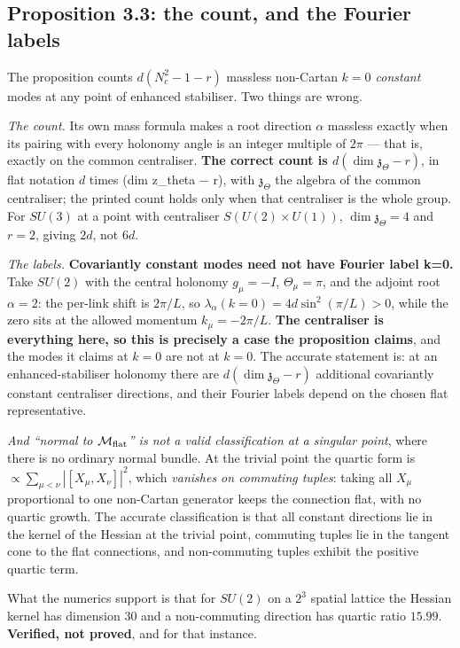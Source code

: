 \documentclass[11pt]{article}
\newcommand{\Mf}{\mathcal M_{\rm flat}}
\newcommand{\z}{\mathfrak z}
\begin{document}
\subsection{Proposition 3.3: the count, and the Fourier labels}

The proposition counts $d(N_c^2-1-r)$ massless non-Cartan \emph{$k=0$ constant} modes at
any point of enhanced stabiliser. Two things are wrong.

\emph{The count.} Its own mass formula makes a root direction $\alpha$ massless exactly
when its pairing with every holonomy angle is an integer multiple of $2\pi$ --- that is,
exactly on the common centraliser. \textbf{The correct count is $d(\dim\z_\Theta-r)$},
in flat notation $d$ times (dim z\_theta $-$ r), with $\z_\Theta$ the algebra of the
common centraliser; the printed count holds only when that centraliser is the whole
group. For $SU(3)$ at a point with centraliser $S(U(2)\times U(1))$, $\dim\z_\Theta=4$
and $r=2$, giving $2d$, not $6d$.

\emph{The labels.} \textbf{Covariantly constant modes need not have Fourier label k=0.}
Take $SU(2)$ with the central holonomy $g_\mu=-I$, $\Theta_\mu=\pi$, and the adjoint root
$\alpha=2$: the per-link shift is $2\pi/L$, so
$\lambda_\alpha(k=0)=4d\sin^2(\pi/L)>0$, while the zero sits at the allowed momentum
$k_\mu=-2\pi/L$. \textbf{The centraliser is everything here, so this is precisely a case
the proposition claims}, and the modes it claims at $k=0$ are not at $k=0$. The accurate
statement is: at an enhanced-stabiliser holonomy there are $d(\dim\z_\Theta-r)$
additional covariantly constant centraliser directions, and their Fourier labels depend
on the chosen flat representative.

\emph{And ``normal to $\Mf$'' is not a valid classification at a singular point}, where
there is no ordinary normal bundle. At the trivial point the quartic form is
$\propto\sum_{\mu<\nu}|[X_\mu,X_\nu]|^2$, which \emph{vanishes on commuting tuples}:
taking all $X_\mu$ proportional to one non-Cartan generator keeps the connection flat,
with no quartic growth. The accurate classification is that all constant directions lie
in the kernel of the Hessian at the trivial point, commuting tuples lie in the tangent
cone to the flat connections, and non-commuting tuples exhibit the positive quartic term.

What the numerics support is that for $SU(2)$ on a $2^3$ spatial lattice the Hessian
kernel has dimension $30$ and a non-commuting direction has quartic ratio $15.99$.
\textbf{Verified, not proved}, and for that instance.
\end{document}

